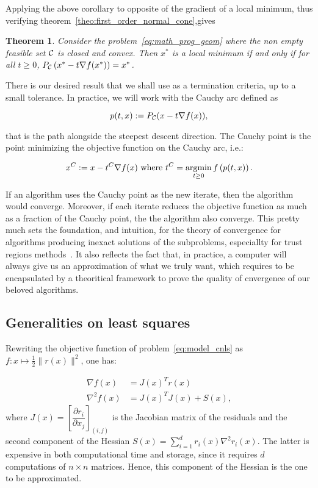 \documentclass[10pt]{article}
\newtheorem{theorem}{Theorem}[]
\numberwithin{equation}{section}
\begin{document}
	Applying the above corollary to opposite of the gradient of a local minimum, thus verifying theorem~\ref{theo:first_order_normal_cone},gives 
	
	\begin{theorem}
	Consider the problem~\eqref{eq:math_prog_geom} where the non empty feasible set ${\mathcal{C}}$ is closed and convex. Then $x^*$ is a local minimum if and only if for all $t \ge 0$, $P_{\mathcal{C}}\left(x^*-t\nabla f(x^*)\right)=x^*$.
	\end{theorem}
	
	There is our desired result that we shall use as a termination criteria, up to a small tolerance. In practice, we will work with the Cauchy arc defined as
	
	\begin{equation}\label{eq:cauchy_arc}
		p(t,x) := P_{\mathcal{C}}(x-t\nabla f(x)),
	\end{equation}
	
	that is the path alongside the steepest descent direction. The Cauchy point is the point minimizing the objective function on the Cauchy arc, i.e.:
	
	\begin{equation}
		x^C := x - t^C \nabla f(x) \text{ where } t^C = \operatorname*{argmin}_{t \ge 0} f\left(p(t,x)\right).
	\end{equation}
	
	If an algorithm uses the Cauchy point as the new iterate, then the algorithm would converge. Moreover, if each iterate reduces the objective function as much as a fraction of the Cauchy point, the the algorithm also converge. This pretty much sets the foundation, and intuition, for the theory of convergence for algorithms producing inexact solutions of the subproblems, especiallty for trust regions methods~\cite{conn-etal:2000}. It also reflects the fact that, in practice, a computer will always give us an approximation of what we truly want, which requires to be encapsulated by a theoritical framework to prove the quality of cnvergence of our beloved algorithms.
	
	\subsection{Generalities on least squares}
	 
	 Rewriting the objective function of problem~\eqref{eq:model_cnls} as $f\colon x \mapsto  \frac{1}{2} \|r(x)\|^2$, one has:
	 
	 \begin{subequations}
	 		\begin{align}
	 		\nabla f(x) &= J(x)^Tr(x)\label{subeq:ls_grad} \\
	 		\nabla^2 f(x) &= J(x)^TJ(x) + S(x) , \label{subeq:ls_hessian}
	 		\end{align}
	 \end{subequations}
	 where $J(x) = \left[\dfrac{\partial r_i}{\partial x_j}\right]_{(i,j)}$ is the Jacobian matrix of the residuals and the second component of the Hessian $S(x) = \sum_{i=1}^{d} r_i(x) \nabla^2r_i(x) $. The latter is expensive in both computational time and storage, since it requires $d$ computations of $n\times n$ matrices. Hence, this component of the Hessian is the one to be approximated. 
	 
\end{document}

